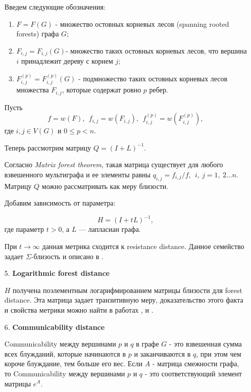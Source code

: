 \begin{itemize}
Введем следующие обозначения: 

\begin{enumerate}
\item $F = F(G)$ - множество остовных корневых лесов (spanning rooted forests) графа $G$; 
\item $F_{i,j} = F_{i,j}(G)$- множество таких остовных корневых лесов, что вершина $i$ принадлежит дереву с корнем $j$; 
\item $F_{i,j}^{(p)} = F_{i,j}^{(p)}(G)$ - подмножество таких остовных корневых лесов множества $F_{i,j}$, которые содержат ровно $p$ ребер.
\end{enumerate}

Пусть 
$$f = w(F),\ \  f_{i,j} = w(F_{i,j}),\ \  f_{i,j}^{(p)} = w(F_{i,j}^{(p)}),$$ 
где $i,j \in V(G)$ и $0 \le p < n$.

Теперь рассмотрим матрицу $Q = (I + L)^{-1}$.

Согласно \emph{Matrix forest theorem}, такая матрица существует для любого взвешенного мультиграфа и ее элементы равны $q_{i,j} = f_{i,j}/f,\ \ i,\ j = 1,\ 2\ldots n$. Матрицу $Q$ можно рассматривать как меру близости. 

Добавим зависимость от параметра:

\begin{equation}
H = (I + tL) ^{-1}, 
\end{equation} 
где параметр $t > 0$, а $L$ --- лапласиан графа.

При $t \rightarrow \infty$ данная метрика сходится к resistance distance. Данное семейство задает $\Sigma$-близость и описано в \cite{chebotarev2011class}.

\item[5.] \textbf{Logarithmic forest distance}

$H$ получена поэлементным логарифмированием матрицы близости для forest distance. Эта матрица задает транзитивную меру, доказательство этого факта и свойства метрики можно найти в работах \cite{chebotarev2011bottleneck}, \cite{chebotarev2002forest} и \cite{chebotarev2011class}.

\item[6.] \textbf{Communicability distance}

Communicability между вершинами $p$ и $q$ в графе $G$ - это взвешенная сумма всех блужданий, которые начинаются в $p$ и заканчиваются в $q$, при этом чем короче блуждание, тем больше его вес. Если $A$ - матрица смежности графа, то Communicability между вершинами $p$ и $q$ - это соответствующий элемент матрицы $e^{A}$. 


\end{itemize}
